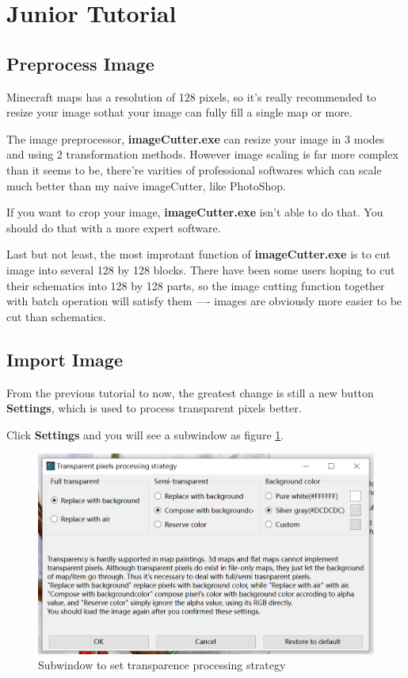 \documentclass{article}
\begin{document}
\pagebreak
\section{Junior Tutorial}

\subsection{Preprocess Image}
Minecraft maps has a resolution of 128 pixels, so it's really recommended to resize your image sothat your image can fully fill a single map or more.

The image preprocessor, \textbf{imageCutter.exe} can resize your image in 3 modes and using 2 transformation methods. However image scaling is far more complex than it seems to be, there're varities of professional softwares which can scale much better than my naive imageCutter, like PhotoShop.

If you want to crop your image, \textbf{imageCutter.exe} isn't able to do that. You should do that with a more expert software.

Last but not least, the most improtant function of \textbf{imageCutter.exe} is to cut image into several 128 by 128 blocks. There have been some users hoping to cut their schematics into 128 by 128 parts, so the image cutting function together with batch operation will satisfy them ---- images are obviously more easier to be cut than schematics.

\subsection{Import Image}
From the previous tutorial to now, the greatest change is still a new button \textbf{Settings}, which is used to process transparent pixels better.

Click \textbf{Settings} and you will see a subwindow as figure \ref*{SetTPS}.

\begin{figure}[htbp]
    \centering
    \includegraphics[width=15cm]{Img1_TPS.png}
    \caption{Subwindow to set transparence processing strategy}
    \label{SetTPS}
\end{figure}
\end{document}
